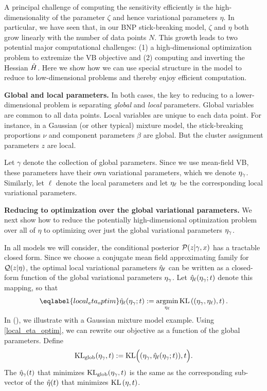 A principal challenge of computing the sensitivity efficiently is the
high-dimensionality of the parameter $\zeta$ and hence variational parameters
$\eta$. In particular, we have seen that, in our BNP stick-breaking model,
$\zeta$ and $\eta$ both grow linearly with the number of data points $N$. This
growth leads to two potential major computational challenges: (1) a
high-dimensional optimization problem to extremize the VB objective and (2)
computing and inverting the Hessian $\hat{H}$. Here we show how we can use
special structure in the model to reduce to low-dimensional problems and thereby
enjoy efficient computation.

\noindent \textbf{Global and local parameters.} In both cases, the key to
reducing to a lower-dimensional problem is separating \emph{global} and
\emph{local} parameters. Global variables are common to all data points. Local
variables are unique to each data point. For instance, in a Gaussian (or other
typical) mixture model, the stick-breaking proportions $\nu$ and component
parameters $\beta$ are global. But the cluster assignment parameters $z$ are
local.

Let $\gamma$ denote the collection of global parameters. Since we use mean-field
VB, these parameters have their own variational parameters, which we denote
$\eta_{\gamma}$. Similarly, let $\ell$ denote the local parameters and let
$\eta_{\ell}$ be the corresponding local variational parameters.

\noindent \textbf{Reducing to optimization over the global variational
parameters.} We next show how to reduce the potentially high-dimensional
optimization problem over all of $\eta$ to optimizing over just the global
variational parameters $\eta_{\gamma}$.

In all models we will consider, the conditional posterior $\mathcal{P}(z \vert
\gamma,x)$ has a tractable closed form.  Since we choose a conjugate mean field
approximating family for $\mathcal{Q}(z \vert \eta)$, the optimal local variational
parameters $\hat\eta_{\ell}$ can be written as a closed-form function of the global
variational parameters $\eta_{\gamma}$. Let $\hat\eta_{\ell}(\eta_\gamma; t)$ denote
this mapping, so that
%
\begin{align}\eqlabel{local_eta_optim}
\etaoptlocal(\etaglob; \t) :=
    \argmin_{\etalocal} \KL{(\eta_\gamma, \etalocal), \t}.
\end{align}
%
In  (), we illustrate with a
Gaussian mixture model example.
%
Using \eqref{local_eta_optim}, we can rewrite our objective as a
function of the global parameters.  Define
%
\begin{align*}
\KLglobal(\etaglob, \t) :=
    \mathrm{KL}\Big((\etaglob, \etaoptlocal(\etaglob; \t)), \t\Big).
\end{align*}
%
The $\hat\eta_{\gamma}(t)$ that minimizes $\mathrm{KL}_{\mathrm{glob}}(\eta_{\gamma}, t)$ is the same as
the corresponding sub-vector of the $\hat\eta(t)$ that minimizes $\mathrm{KL}\left(\eta,
t\right)$.  %

